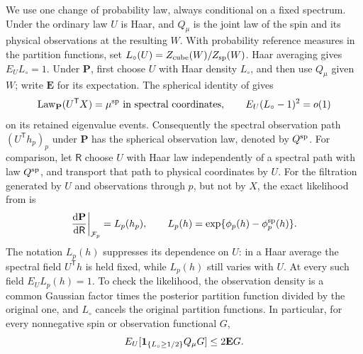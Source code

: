 We use one change of probability law, always conditional on a fixed
spectrum.  Under the ordinary law \(U\) is Haar, and \(Q_\mu\) is the
joint law of the spin and its physical observations at the resulting
\(W\).  With probability reference measures in the partition functions,
set \(L_\circ(U)=Z_{\rm cube}(W)/Z_{\rm sp}(W)\).
Haar averaging gives \(E_UL_\circ=1\).  Under \(\mathbf P\), first choose
\(U\) with Haar density \(L_\circ\), and then use \(Q_\mu\) given \(W\);
write \(\mathbf E\) for its expectation.  The spherical identity of
\cite[Lemma~2.5 and Equation~(2.8)]{FUA} gives
\begin{equation}\label{edge:haar-bias}
 \operatorname{Law}_{\mathbf P}(U^{\mathsf T}X)
   =\mu^{\rm sp}\text{ in spectral coordinates},\qquad
 E_U(L_\circ-1)^2=o(1)
\end{equation}
on its retained eigenvalue events.  Consequently the spectral observation
path \((U^{\mathsf T}h_p)_p\) under \(\mathbf P\) has the spherical
observation law, denoted by \(Q^{\rm sp}\).  For comparison, let
\(\mathsf R\) choose \(U\) with Haar law independently of a spectral
path with law \(Q^{\rm sp}\), and transport that path to physical
coordinates by \(U\).
For the filtration generated by \(U\) and observations through \(p\),
but not by \(X\), the exact likelihood from \cite[Equation~(2.9)]{FUA} is
\begin{equation}\label{edge:path-likelihood}
 \frac{\mathrm d\mathbf P}{\mathrm d\mathsf R}\bigg|_{\mathcal F_p}
 =L_p(h_p),\qquad
 L_p(h)=\exp\{\phi_p(h)-\phi_p^{\rm sp}(h)\}.
\end{equation}
The notation \(L_p(h)\) suppresses its dependence on \(U\): in a Haar
average the spectral field \(U^{\mathsf T}h\) is held fixed, while
\(L_p(h)\) still varies with \(U\).  At every such field \(E_UL_p(h)=1\).
To check the likelihood,
the observation density is a common Gaussian factor times the posterior
partition function divided by the original one, and \(L_\circ\) cancels
the original partition functions.  In particular, for every nonnegative
spin or observation functional \(G\),
\begin{equation}\label{edge:bias-transfer}
 E_U[\mathbf 1_{\{L_\circ\ge1/2\}}Q_\mu G]\le2\mathbf E G.
\end{equation}


